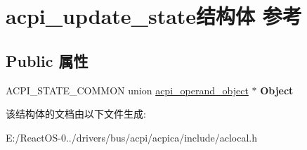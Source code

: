 \hypertarget{structacpi__update__state}{}\section{acpi\+\_\+update\+\_\+state结构体 参考}
\label{structacpi__update__state}
\subsection*{Public 属性}
\begin{DoxyCompactItemize}
\item 
\mbox{\label{structacpi__update__state_ab2279870b85eee05d7d9baa0dc873602}} 
A\+C\+P\+I\+\_\+\+S\+T\+A\+T\+E\+\_\+\+C\+O\+M\+M\+ON union \hyperlink{unionacpi__operand__object}{acpi\+\_\+operand\+\_\+object} $\ast$ {\bfseries Object}
\end{DoxyCompactItemize}


该结构体的文档由以下文件生成\+:\begin{DoxyCompactItemize}
\item 
E\+:/\+React\+O\+S-\/0../drivers/bus/acpi/acpica/include/aclocal.\+h\end{DoxyCompactItemize}
